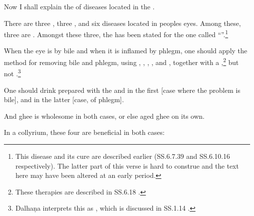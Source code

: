 \begin{translation}
    
    \item[1]  Now I shall explain the  of diseases
    located in the .
    
    \item[2]  There are three , three ,
    and six  diseases located in peoples eyes. Among these,
    three are . Amongst these three, %
    the  has been stated for the one called
    “”.\footnote{This disease and its cure are 
    described earlier (SS.6.7.39 and SS.6.10.16 
    \citep[609 and 614]{vulgate} respectively). The latter part of this verse is
    hard to construe and the text here may have been altered at an early period.}
    
    \item[3--5ab]  When the eye is  by bile and when it is 
    inflamed 
    by phlegm, one should apply the method for removing bile and phlegm, using 
    , 
    ,
    ,
    , and 
    ,
    together with a ,\footnote{These therapies are described in 
    SS.6.18 
    \citep[633--640]{vulgate}.} but not 
    .\footnote{Dalhaṇa interprets this as 
    , which is discussed in SS.1.14 \citep[]{vulgate}.}
    
    One should drink  prepared with the  
    and in the first [case where the problem is bile], and  in the 
    latter [case, of phlegm].
    
    And ghee  is wholesome in both cases, or else 
    aged ghee on its own.
    
    \item[5cd--7ab]
    
    In a collyrium, these four  are beneficial in both cases:
    \begin{itemize}
        

\end{itemize}
\end{translation}
